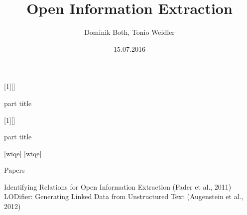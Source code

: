 \documentclass[11pt]{beamer}
\author{Dominik Both, Tonio Weidler}
\title{Open Information Extraction}
\institute{Institut für Computerlinguistik, Universität Heidelberg}
\date{15.07.2016}
\begin{document}
\AtBeginSection{\frame{\sectionpage}}
\AtBeginSubsection{\frame{\subsectionpage}}



[1][]{%
  \begin{centering}
    \begin{beamercolorbox}[center]{part title}
      \Huge\insertsection\par
    \end{beamercolorbox}
  \end{centering}
}

[1][]{%
  \begin{centering}
    \begin{beamercolorbox}[center]{}
      \insertsection\par
    \end{beamercolorbox}
    \begin{beamercolorbox}[sep=2pt,center]{part title}
		\huge\insertsubsection\par
    \end{beamercolorbox}
  \end{centering}
}
\setcounter{tocdepth}{1}
[wiqe]
[wiqe]

\newcommand{\hitem}{
	\item[\color{lightgray}\rule{0.5em}{0.5em}]
}

\begin{frame}
\titlepage
\end{frame}

\begin{frame}{Papers}

Identifying Relations for Open Information Extraction (Fader et al., 2011)\\
\vspace{15pt}
LODifier: Generating Linked Data from Unstructured Text (Augenstein et al., 2012)

\end{frame}
\end{document}
